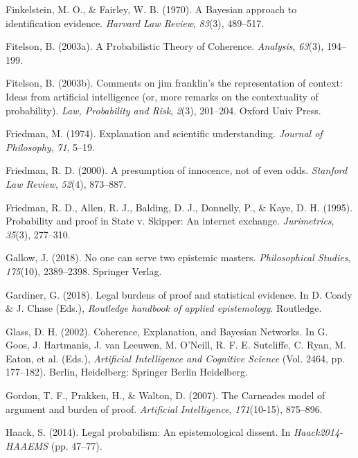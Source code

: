 \documentclass[11pt,dvipsnames,enabledeprecatedfontcommands]{scrartcl}
\begin{document}
\hypertarget{ref-Finkelstein1970A}{}
Finkelstein, M. O., \& Fairley, W. B. (1970). A Bayesian approach to
identification evidence. \emph{Harvard Law Review}, \emph{83}(3),
489--517.

\hypertarget{ref-fitelson2003ProbabilisticTheoryCoherence}{}
Fitelson, B. (2003a). A Probabilistic Theory of Coherence.
\emph{Analysis}, \emph{63}(3), 194--199.

\hypertarget{ref-fitelson2003comments}{}
Fitelson, B. (2003b). Comments on jim franklin's the representation of
context: Ideas from artificial intelligence (or, more remarks on the
contextuality of probability). \emph{Law, Probability and Risk},
\emph{2}(3), 201--204. Oxford Univ Press.

\hypertarget{ref-friedman1974}{}
Friedman, M. (1974). Explanation and scientific understanding.
\emph{Journal of Philosophy}, \emph{71}, 5--19.

\hypertarget{ref-Friedman2000}{}
Friedman, R. D. (2000). A presumption of innocence, not of even odds.
\emph{Stanford Law Review}, \emph{52}(4), 873--887.

\hypertarget{ref-friedmanEtAl1995}{}
Friedman, R. D., Allen, R. J., Balding, D. J., Donnelly, P., \& Kaye, D.
H. (1995). Probability and proof in State v. Skipper: An internet
exchange. \emph{Jurimetrics}, \emph{35}(3), 277--310.

\hypertarget{ref-Gallow2018No}{}
Gallow, J. (2018). No one can serve two epistemic masters.
\emph{Philosophical Studies}, \emph{175}(10), 2389--2398. Springer
Verlag.

\hypertarget{ref-gardiner2018}{}
Gardiner, G. (2018). Legal burdens of proof and statistical evidence. In
D. Coady \& J. Chase (Eds.), \emph{Routledge handbook of applied
epistemology}. Routledge.

\hypertarget{ref-glass2002}{}
Glass, D. H. (2002). Coherence, Explanation, and Bayesian Networks. In
G. Goos, J. Hartmanis, J. van Leeuwen, M. O'Neill, R. F. E. Sutcliffe,
C. Ryan, M. Eaton, et al. (Eds.), \emph{Artificial Intelligence and
Cognitive Science} (Vol. 2464, pp. 177--182). Berlin, Heidelberg:
Springer Berlin Heidelberg.

\hypertarget{ref-gordon2007}{}
Gordon, T. F., Prakken, H., \& Walton, D. (2007). The Carneades model of
argument and burden of proof. \emph{Artificial Intelligence},
\emph{171}(10-15), 875--896.

\hypertarget{ref-haack2011legal}{}
Haack, S. (2014). Legal probabilism: An epistemological dissent. In
\emph{Haack2014-HAAEMS} (pp. 47--77).
\end{document}
